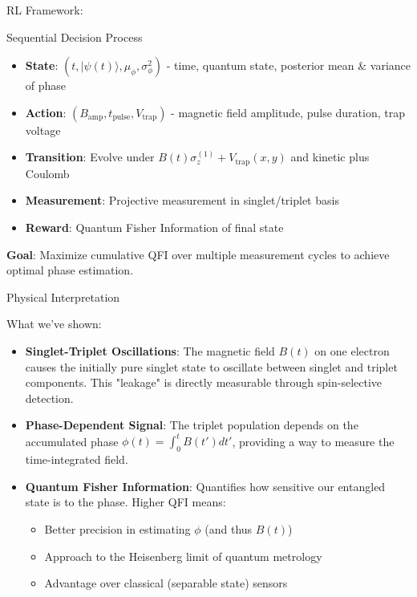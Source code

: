\documentclass{beamer}
\begin{document}
\begin{frame}{RL Framework:}

\begin{alertblock}{Sequential Decision Process}
\begin{itemize}    
\item \textbf{State}: $(t, |\psi(t)\rangle, \mu_\phi, \sigma_\phi^2)$ - time, quantum state, posterior mean & variance of phase
\item \textbf{Action}: $(B_{\text{amp}}, t_{\text{pulse}}, V_{\text{trap}})$ - magnetic field amplitude, pulse duration, trap voltage
\item  \textbf{Transition}: Evolve under $B(t)\sigma_z^{(1)} + V_{\text{trap}}(x,y)$ and kinetic plus Coulomb
\item \textbf{Measurement}: Projective measurement in singlet/triplet basis
\item \textbf{Reward}: Quantum Fisher Information of final state
\end{itemize}
\end{alertblock}
\textbf{Goal}: Maximize cumulative QFI over multiple measurement cycles to achieve optimal phase estimation.

\end{frame}

\begin{frame}{Physical Interpretation}

\begin{alertblock}{What we've shown:}
\begin{itemize}
\item \textbf{Singlet-Triplet Oscillations}: The magnetic field $B(t)$ on one electron causes the initially pure singlet state to oscillate between singlet and triplet components. This "leakage" is directly measurable through spin-selective detection.
\item \textbf{Phase-Dependent Signal}: The triplet population depends on the accumulated phase $\phi(t) = \int_0^t B(t') dt'$, providing a way to measure the time-integrated field.

\item \textbf{Quantum Fisher Information}: Quantifies how sensitive our entangled state is to the phase. Higher QFI means:
\begin{itemize}
\item Better precision in estimating $\phi$ (and thus $B(t)$)
\item Approach to the Heisenberg limit of quantum metrology
\item Advantage over classical (separable state) sensors
\end{itemize}
\end{itemize}
\end{alertblock}
\end{frame}
\end{document}
